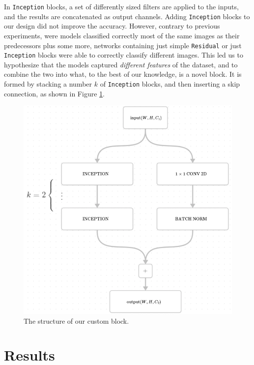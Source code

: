\documentclass[11pt]{article}
\begin{document}
\begin{multicols}{2}
      In \texttt{Inception} blocks, a set of differently sized filters are applied to the inputs, and the results are concatenated as output channels. Adding \texttt{In\-cep\-tion} blocks to our design did not improve the accuracy. However, contrary to previous experiments, were models classified correctly most of the same images as their predecessors plus some more, networks containing just simple \texttt{Re\-si\-dual} or just \texttt{In\-cep\-tion} blocks were able to correctly classify different images. This led us to hypothesize that the models captured \textit{different features} of the dataset, and to combine the two into what, to the best of our knowledge, is a novel block. It is formed by stacking a number $k$ of \texttt{Inception} blocks, and then inserting a skip connection, as shown in Figure \ref{fig:custom_block}.

      \begin{figure}[H]
            \centering
            \includegraphics[width=0.7\linewidth]{custom_block.png}
            \caption{The structure of our custom block.}
            \label{fig:custom_block}
      \end{figure}

      \label{sec:results}
      \section{Results}


\end{multicols}
\end{document}

